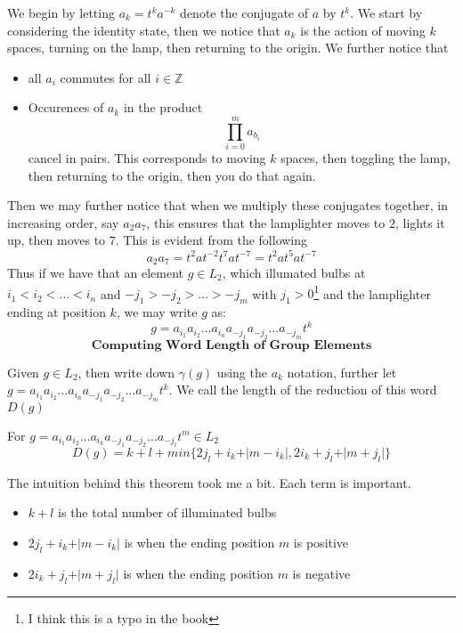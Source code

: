 We begin by letting $a_k=t^{k}a^{-k}$ denote the conjugate of $a$ by $t^{k}$. We start by considering the identity state, then we notice that $a_k$ is the action of moving $k$ spaces, turning on the lamp, then returning to the origin. We further notice that
\begin{itemize}
    \item all $a_i$ commutes for all $i\in\mathbb{Z}$
    \item Occurences of $a_k$ in the product
    \[\prod_{i=0}^{m}a_{b_i}\] 
    cancel in pairs. This corresponds to moving $k$ spaces, then toggling the lamp, then returning to the origin, then you do that again.
\end{itemize}
Then we may further notice that when we multiply these conjugates together, in increasing order, say $a_2a_7$, this ensures that the lamplighter moves to $2$, lights it up, then moves to $7$. This is evident from the following
\[a_2a_7 = t^2at^{-2}t^7at^{-7}=t^2at^5at^{-7}\]
Thus if we have that an element $g\in L_2$, which illumated bulbs at $i_1<i_2<\ldots<i_n$ and $-j_1>-j_2>\ldots > -j_m$ with $j_1>0$\footnote{I think this is a typo in the book} and the lamplighter ending at position $k$, we may write $g$ as:
\[ g = a_{i_1}a_{i_2}\ldots a_{i_n}a_{-j_1}a_{-j_2}\ldots a_{-j_m}t^k\]
\[\textbf{Computing Word Length of Group Elements}\]
\begin{definition}
    Given $g\in L_2$, then write down $\gamma(g)$ using the $a_k$ notation, further let $g = a_{i_1}a_{i_2}\ldots a_{i_n}a_{-j_1}a_{-j_2}\ldots a_{-j_m}t^k$. We call the length of the reduction of this word $D(g)$
\end{definition}
\begin{theorem}
    For $g = a_{i_1}a_{i_2}\ldots a_{i_k}a_{-j_1}a_{-j_2}\ldots a_{-j_l}t^m\in L_2$
    \[D(g)=k+l+min\{2j_l +i_k +\vert m-i_k\vert ,2i_k +j_l +\vert m+j_l\vert\}\]
\end{theorem}
The intuition behind this theorem took me a bit. Each term is important.
\begin{itemize}
    \item $k+l$ is the total number of illuminated bulbs
    \item $2j_l +i_k +\vert m-i_k\vert$ is when the ending position $m$ is positive
    
    \item $2i_k +j_l +\vert m+j_l\vert$ is when the ending position $m$ is negative
\end{itemize}
